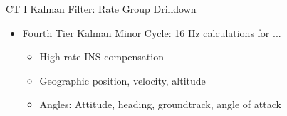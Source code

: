 \begin{frame}
CT I Kalman Filter: Rate Group Drilldown
\begin{itemize}
  \item Fourth Tier Kalman Minor Cycle: 16 Hz calculations for ...
	\begin{itemize}
		\item High-rate INS compensation
		\item Geographic position, velocity, altitude
		\item Angles: Attitude, heading, groundtrack, angle of attack
	\end{itemize}
\end{itemize} 
\end{frame}
